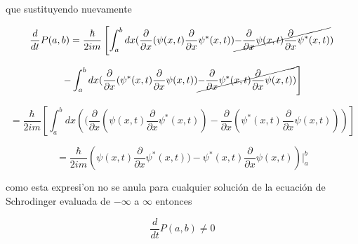 \documentclass[12pt,a4paper]{article}
\begin{document}
\begin{enumerate}
    que sustituyendo nuevamente
    
    \begin{equation*}
        \frac{d}{d t} P(a,b) = \frac{\hbar}{2im} \left[ \int_{a}^{b} dx  (\frac{\partial}{\partial x}(\psi(x,t) \frac{\partial}{\partial x} \psi^*(x,t)) \cancel{-  \frac{\partial}{\partial x} \psi (x,t)\frac{\partial}{\partial x} \psi^*(x,t)})\right.
    \end{equation*}
    
    \begin{equation*}
        \left. - \int_{a}^{b} dx (\frac{\partial}{\partial x}(\psi^*(x,t) \frac{\partial}{\partial x} \psi(x,t)) \cancel{-  \frac{\partial}{\partial x} \psi^* (x,t)\frac{\partial}{\partial x} \psi(x,t))} \right]
    \end{equation*}
    
    \begin{equation*}
         = \frac{\hbar}{2im} \left[\int_{a}^{b} dx\left(  (\frac{\partial}{\partial x}(\psi(x,t) \frac{\partial}{\partial x} \psi^*(x,t)) - \frac{\partial}{\partial x}(\psi^*(x,t) \frac{\partial}{\partial x} \psi(x,t))\right) \right]
    \end{equation*}
    
    \begin{equation*}
        = \frac{\hbar}{2im} \left(  \psi(x,t) \frac{\partial}{\partial x} \psi^*(x,t)) - \psi^*(x,t) \frac{\partial}{\partial x} \psi(x,t)\right)|_{a}^{b}
    \end{equation*}
    
    como esta expresi'on no se anula para cualquier solución de la ecuación de Schrodinger evaluada de $-\infty$ a $\infty$ entonces 
    
    \begin{equation*}
        \frac{d}{d t} P(a,b) \neq 0
    \end{equation*}
    
    
    
    
    

    
    
\end{enumerate}
\end{document}
